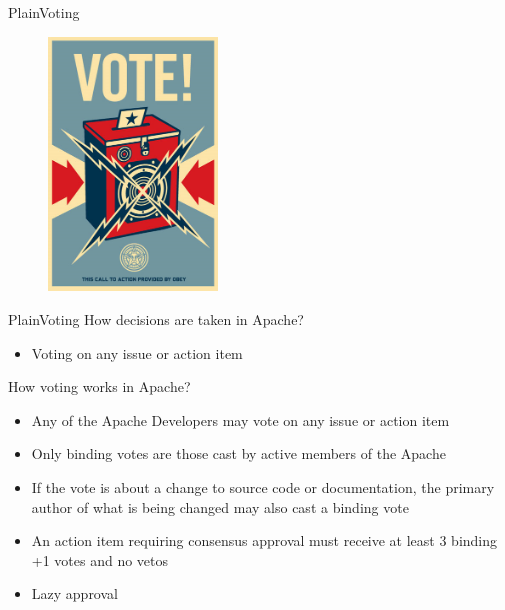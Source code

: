 \documentclass[10pt]{beamer}
\begin{document}
\begin{frame}{Plain}{Voting}
  \begin{figure}[ht]
    \centering
    \includegraphics[width=0.4\textwidth, keepaspectratio=true]{images/vote.jpg}
  \end{figure}
\end{frame}

\begin{frame}{Plain}{Voting}
  How decisions are taken in Apache? \pause
  \begin{itemize}
    \item Voting on any issue or action item
  \end{itemize}

  How voting works in Apache? \pause
  \begin{itemize}
    \item Any of the Apache Developers may vote on any issue or action
          item \pause
    \item Only binding votes are those cast by active members of the
          Apache \pause
    \item If the vote is about a change to source code or documentation,
          the primary author of what is being changed may also cast a binding
          vote \pause
    \item An action item requiring consensus approval must receive at least 3
          binding +1 votes and no vetos \pause
    \item Lazy approval
  \end{itemize}
\end{frame}

\end{document}
